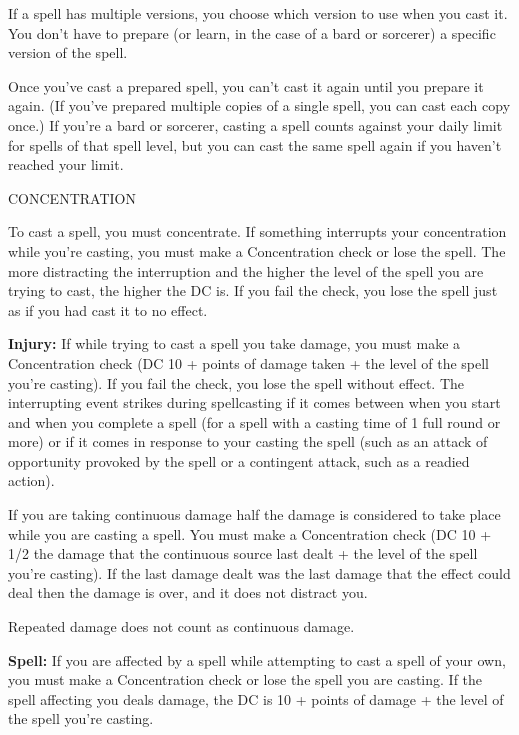 \documentclass{article}
\begin{document}
If a spell has multiple versions, you choose which version to use when you cast 
it. You don't have to prepare (or learn, in the case of a bard or sorcerer) a specific 
version of the spell.

Once you've cast a prepared spell, you can't cast it again until you prepare it 
again. (If you've prepared multiple copies of a single spell, you can cast each 
copy once.) If you're a bard or sorcerer, casting a spell counts against your daily 
limit for spells of that spell level, but you can cast the same spell again if 
you haven't reached your limit.

\vspace{12pt}
CONCENTRATION

To cast a spell, you must concentrate. If something interrupts your concentration 
while you're casting, you must make a Concentration check or lose the spell. The 
more distracting the interruption and the higher the level of the spell you are 
trying to cast, the higher the DC is. If you fail the check, you lose the spell 
just as if you had cast it to no effect.

\textbf{Injury:} If while trying to cast a spell you take damage, you must make 
a Concentration check (DC 10 + points of damage taken + the level of the spell 
you're casting). If you fail the check, you lose the spell without effect. The 
interrupting event strikes during spellcasting if it comes between when you start 
and when you complete a spell (for a spell with a casting time of 1 full round 
or more) or if it comes in response to your casting the spell (such as an attack 
of opportunity provoked by the spell or a contingent attack, such as a readied 
action).

If you are taking continuous damage half the damage is considered to take place 
while you are casting a spell. You must make a Concentration check (DC 10 + 1/2 
the damage that the continuous source last dealt + the level of the spell you're 
casting). If the last damage dealt was the last damage that the effect could deal 
then the damage is over, and it does not distract you.

Repeated damage does not count as continuous damage.

\textbf{Spell: }If you are affected by a spell while attempting to cast a spell 
of your own, you must make a Concentration check or lose the spell you are casting. 
If the spell affecting you deals damage, the DC is 10 + points of damage + the 
level of the spell you're casting.
\end{document}
